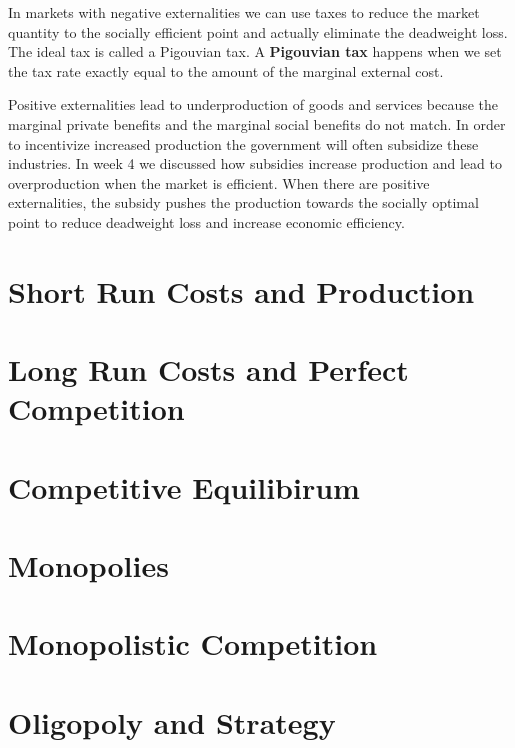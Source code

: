 \documentclass[
]{book}
\begin{document}
In markets with negative externalities we can use taxes to reduce the market quantity to the socially efficient point and actually eliminate the deadweight loss. The ideal tax is called a Pigouvian tax. A \textbf{Pigouvian tax} happens when we set the tax rate exactly equal to the amount of the marginal external cost.

Positive externalities lead to underproduction of goods and services because the marginal private benefits and the marginal social benefits do not match. In order to incentivize increased production the government will often subsidize these industries. In week 4 we discussed how subsidies increase production and lead to overproduction when the market is efficient. When there are positive externalities, the subsidy pushes the production towards the socially optimal point to reduce deadweight loss and increase economic efficiency.

\chapter{Short Run Costs and Production}\label{short-run-costs-and-production}

\chapter{Long Run Costs and Perfect Competition}\label{long-run-costs-and-perfect-competition}

\chapter{Competitive Equilibirum}\label{competitive-equilibirum}

\chapter{Monopolies}\label{monopolies}

\chapter{Monopolistic Competition}\label{monopolistic-competition}

\chapter{Oligopoly and Strategy}\label{oligopoly-and-strategy}


\end{document}

